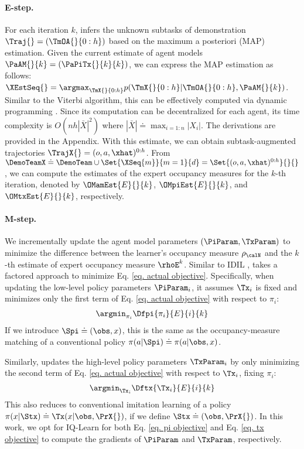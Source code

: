 \paragraph{E-step.}
For each iteration $k$, \ouralg infers the unknown subtasks of demonstration $\Traj{}=(\TmOA{}{0:h})$ based on the maximum a posteriori (MAP) estimation. Given the current estimate of agent models $\PaAM{}{k} = (\PaPiTx{}{k}{k})$, we can express the MAP estimation as follows: $ \XEstSeq{} = \argmax_{\TmX{}{0:h}} p(\TmX{}{0:h}|\TmOA{}{0:h}, \PaAM{}{k}) $.
Similar to the Viterbi algorithm, this can be effectively computed via dynamic programming \cite{seo2022semi,jing2021adversarial}. Since its computation can be decentralized for each agent, its time complexity is $O(nh|\bar{X}|^2)$ where $|\bar{X}| \doteq \max_{i=1:n} |X_i|$.
The derivations are provided in the Appendix. With this estimate, we can obtain subtask-augmented trajectories $\TrajX{} = (o, a, \xhat)^{0:h}$. From $\DemoTeamX \doteq \DemoTeam \cup \Set{\XSeq{m}}{m=1}{d}=\Set{(o, a, \xhat)^{0:h}}{}{}$, we can compute the estimates of the expert occupancy measures for the $k$-th iteration, denoted by $\OMamEst{E}{}{k}$, $\OMpiEst{E}{}{k}$, and $\OMtxEst{E}{}{k}$, respectively.


\paragraph{M-step.}
We incrementally update the agent model parameters $(\PiParam, \TxParam)$ to minimize the difference between the learner's occupancy measure $\rho_{\calN}$ and the $k$-th estimate of expert occupancy measure $\rhoE^k$. Similar to IDIL \cite{seo2024idil}, \ouralg takes a factored approach to minimize Eq. \ref{eq. actual objective}. 
Specifically, when updating the low-level policy parameters $\PiParam_i$, it assumes $\Tx_i$ is fixed and minimizes only the first term of Eq. \ref{eq. actual objective} with respect to $\pi_{i}$: 
\begin{align}
    \argmin_{\pi_i} \Dfpi{\pi_i}{E}{i}{k} \label{eq. pi objective}
\end{align}
If we introduce $\Spi \doteq (\obs, x)$, this is the same as the occupancy-measure matching of a conventional policy $\pi(a|\Spi)\doteq \pi(a|\obs, x)$. 

Similarly, \ouralg updates the high-level policy parameters $\TxParam_i$ by only minimizing the second term of Eq. \ref{eq. actual objective} with respect to $\Tx_i$, fixing $\pi_i$:
\begin{align}
    \argmin_{\Tx_i} \Dftx{\Tx_i}{E}{i}{k}  \label{eq. tx objective}
\end{align}
This also reduces to conventional imitation learning of a policy $\pi(x|\Stx) \doteq \Tx(x|\obs,\PrX{})$, if we define $\Stx \doteq (\obs, \PrX{})$.
In this work, we opt for IQ-Learn \cite{garg2021iq} for both Eq. \ref{eq. pi objective} and Eq. \ref{eq. tx objective} to compute the gradients of $\PiParam$ and $\TxParam$, respectively.


